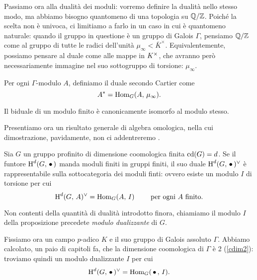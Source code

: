 Passiamo ora alla dualità dei moduli: vorremo definire la dualità nello stesso modo, ma abbiamo bisogno quantomeno di una topologia su $ \mathbb{Q}/\mathbb{Z} $. Poiché la scelta non è univoca, ci limitiamo a farlo in un caso in cui è quantomeno naturale: quando il gruppo in questione è un gruppo di Galois $ \Gamma $, pensiamo $ \mathbb{Q}/\mathbb{Z} $ come al gruppo di tutte le radici dell'unità $ \mu_\infty < \bar{K}^\times $. Equivalentemente, possiamo pensare al duale come alle mappe in $ K^\times $, che avranno però necessariamente immagine nel suo sottogruppo di torsione: $ \mu_\infty. $

\begin{definition}
	Per ogni $ \Gamma $-modulo $ A $, definiamo il duale secondo Cartier come
	\[ A^* = \operatorname{Hom}_G(A, \, \mu_\infty). \]
\end{definition}

\begin{proposition}
	Il biduale di un modulo finito è canonicamente isomorfo al modulo stesso.
\end{proposition}

Presentiamo ora un risultato generale di algebra omologica, nella cui dimostrazione, pavidamente, non ci addentreremo \cite[I.3.6]{SerreGalois}.
\begin{proposition}
	Sia $ G $ un gruppo profinito di dimensione coomologica finita $ \operatorname{cd}(G) = d $. Se il funtore $ \operatorname{H}^d(G,\, \bullet\,) $ manda moduli finiti in gruppi finiti, il suo duale $ \operatorname{H}^d(G,\, \bullet\,)^\vee $ è rappresentabile sulla sottocategoria dei moduli finti: ovvero esiste un modulo $ I $ di torsione per cui
	\[ \operatorname{H}^d(G, \, A )^\vee = \operatorname{Hom}_G(A , \, I) \qquad \text{ per ogni } A \text{ finito.} \]
\end{proposition}

\begin{definition}
	Non contenti della quantità di dualità introdotto finora, chiamiamo il modulo $ I $ della proposizione precedete \emph{modulo dualizzante} di $ G $.
\end{definition}


Fissiamo ora un campo $ p $-adico $ K $ e il suo gruppo di Galois assoluto $ \Gamma $. Abbiamo calcolato, un paio di capitoli fa, che la dimensione coomologica di $ \Gamma $ è 2 (\ref{cdim2}): troviamo quindi un modulo dualizzante $ I $ per cui 
\[ \operatorname{H}^d(G, \, \bullet \, )^\vee = \operatorname{Hom}_G(\,\bullet\, , \, I). \]

